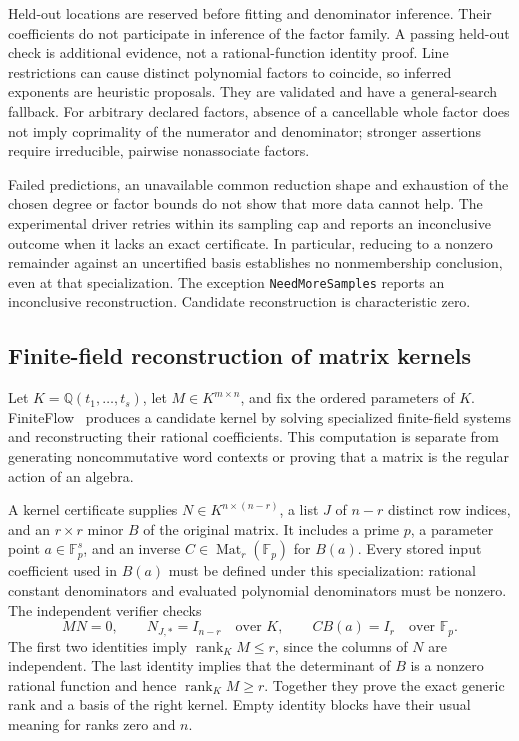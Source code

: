 \documentclass[11pt]{article}
\newcommand{\Q}{\mathbb Q}
\begin{document}
Held-out locations are reserved before fitting and denominator inference. Their
coefficients do not participate in inference of the factor family. A passing
held-out check is additional evidence, not a rational-function identity proof.
Line restrictions can cause distinct polynomial factors to coincide, so inferred
exponents are heuristic proposals. They are validated and have a general-search
fallback. For arbitrary declared factors, absence of a cancellable whole factor
does not imply coprimality of the numerator and denominator; stronger assertions
require irreducible, pairwise nonassociate factors.

Failed predictions, an unavailable common reduction shape and exhaustion of the
chosen degree or factor bounds do not show that more data cannot help. The
experimental driver retries within its sampling cap and reports an inconclusive
outcome when it lacks an exact certificate. In particular, reducing to a nonzero
remainder against an uncertified basis establishes no nonmembership conclusion,
even at that specialization. The exception \texttt{NeedMoreSamples} reports an
inconclusive reconstruction. Candidate reconstruction is characteristic zero.

\subsection{Finite-field reconstruction of matrix kernels}
Let $K=\Q(t_1,\ldots,t_s)$, let $M\in K^{m\times n}$, and fix the ordered
parameters of $K$. FiniteFlow~\cite{finiteflow} produces a candidate kernel by
solving specialized finite-field systems and reconstructing their rational
coefficients. This computation is separate from generating noncommutative word
contexts or proving that a matrix is the regular action of an algebra.

A kernel certificate supplies $N\in K^{n\times(n-r)}$, a list $J$ of $n-r$
distinct row indices, and an $r\times r$ minor $B$ of the original matrix.
It includes a prime $p$, a parameter point $a\in\mathbb F_p^s$, and an inverse
$C\in\operatorname{Mat}_r(\mathbb F_p)$ for $B(a)$. Every stored input
coefficient used in $B(a)$ must be defined under this specialization: rational
constant denominators and evaluated polynomial denominators must be nonzero.
The independent verifier checks
\[
 MN=0,\qquad N_{J,*}=I_{n-r}\quad\text{over }K,
 \qquad C B(a)=I_r\quad\text{over }\mathbb F_p.
\]
The first two identities imply $\operatorname{rank}_K M\le r$, since the
columns of $N$ are independent. The last identity implies that the determinant
of $B$ is a nonzero rational function and hence
$\operatorname{rank}_K M\ge r$. Together they prove the exact generic rank
and a basis of the right kernel. Empty identity blocks have their usual
meaning for ranks zero and $n$.
\end{document}
